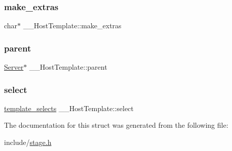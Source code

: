 \mbox{\label{struct_____host_template_a80bac92c13aa822d5cff439c0d66a60f}} 
\subsubsection{\texorpdfstring{make\+\_\+extras}{make\_extras}}
{\footnotesize\ttfamily char$\ast$ \+\_\+\+\_\+\+Host\+Template\+::make\+\_\+extras}

\mbox{\label{struct_____host_template_aa8239544f5fd3a31a47940c7c0de5c5c}} 
\subsubsection{\texorpdfstring{parent}{parent}}
{\footnotesize\ttfamily \mbox{\hyperlink{server_8h_a705d964b8a67edeeb3943273a397e4c2}{Server}}$\ast$ \+\_\+\+\_\+\+Host\+Template\+::parent}

\mbox{\label{struct_____host_template_ad1f4c7a1e25592181f63018195b4ff54}} 
\subsubsection{\texorpdfstring{select}{select}}
{\footnotesize\ttfamily \mbox{\hyperlink{stage_8h_a3ba89b32a5d51c086fa5dfa12e879f06}{template\+\_\+selects}} \+\_\+\+\_\+\+Host\+Template\+::select}



The documentation for this struct was generated from the following file\+:\begin{DoxyCompactItemize}
\item 
include/\mbox{\hyperlink{stage_8h}{stage.\+h}}\end{DoxyCompactItemize}
